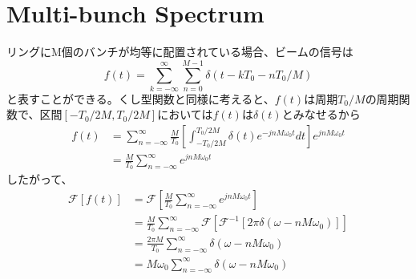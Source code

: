 \documentclass[]{jlreq}
\theoremstyle{definition}
\begin{document}
\section{Multi-bunch Spectrum}
リングにM個のバンチが均等に配置されている場合、ビームの信号は
%
\begin{equation}
  f(t) = \sum_{k=-\infty}^{\infty} \sum_{n=0}^{M-1}\delta (t - k T_0 -n T_0 / M)
\end{equation}
%
と表すことができる。くし型関数と同様に考えると、$f(t)$は周期$T_0/M$の周期関数で、区間$[-T_0/2M, T_0/2M]$においては$f(t)$は$\delta(t)$とみなせるから
%
%
\begin{align}
  f(t) &= \sum_{n = -\infty}^{\infty} \frac{M}{T_0} \left[\int_{-T_0/2M}^{T_0/2M}\delta (t) e^{-j n M \omega_0 t} dt\right] 
  e^{j n M \omega_0 t} \\
              &= \frac{M}{T_0} \sum_{n = -\infty}^{\infty} e^{j n M \omega_0 t} 
\end{align}
%
したがって、
%
\begin{align}
  \mathcal{F}[f(t)] &= \mathcal{F}\left[\frac{M}{T_0} \sum_{n = -\infty}^{\infty} e^{j n M \omega_0 t}\right] \\ 
      & = \frac{M}{T_0} \sum_{n = -\infty}^{\infty} \mathcal{F}[\mathcal{F}^{-1}[2\pi \delta(\omega - n M \omega_0)]] \\ 
      & = \frac{2 \pi M}{T_0} \sum_{n = -\infty}^{\infty} \delta(\omega - n M \omega_0)\\ 
      &= M \omega_0 \sum_{n = -\infty}^{\infty} \delta(\omega - n M \omega_0)
\end{align}
%
\end{document}
